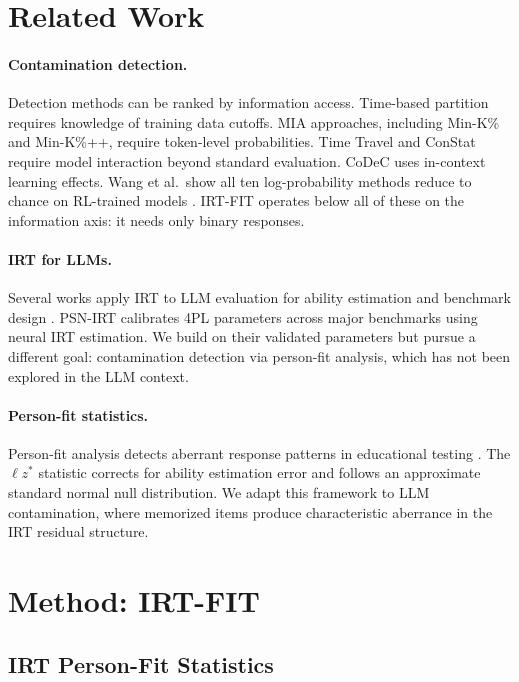 \documentclass[11pt,a4paper]{article}
\newcommand{\lzstar}{$\ell z^*$}
\begin{document}
\section{Related Work}

\paragraph{Contamination detection.} Detection methods can be ranked by information access. Time-based partition \citep{jacovi2023} requires knowledge of training data cutoffs. MIA approaches, including Min-K\% \citep{shi2024mink} and Min-K\%++, require token-level probabilities. Time Travel \citep{dong2024timetravel} and ConStat \citep{dekoninck2024constat} require model interaction beyond standard evaluation. CoDeC \citep{shi2024codec} uses in-context learning effects. Wang et al.\ show all ten log-probability methods reduce to chance on RL-trained models \citep{wang2025postrl}. IRT-FIT operates below all of these on the information axis: it needs only binary responses.

\paragraph{IRT for LLMs.} Several works apply IRT to LLM evaluation for ability estimation and benchmark design \citep{psnirt2026, irt_benchmark_design}. PSN-IRT calibrates 4PL parameters across major benchmarks using neural IRT estimation. We build on their validated parameters but pursue a different goal: contamination detection via person-fit analysis, which has not been explored in the LLM context.

\paragraph{Person-fit statistics.} Person-fit analysis detects aberrant response patterns in educational testing \citep{meijer2001personfit}. The \lzstar{} statistic \citep{snijders2001lzstar} corrects for ability estimation error and follows an approximate standard normal null distribution. We adapt this framework to LLM contamination, where memorized items produce characteristic aberrance in the IRT residual structure.

\section{Method: IRT-FIT}\label{sec:method}

\subsection{IRT Person-Fit Statistics}
\end{document}
